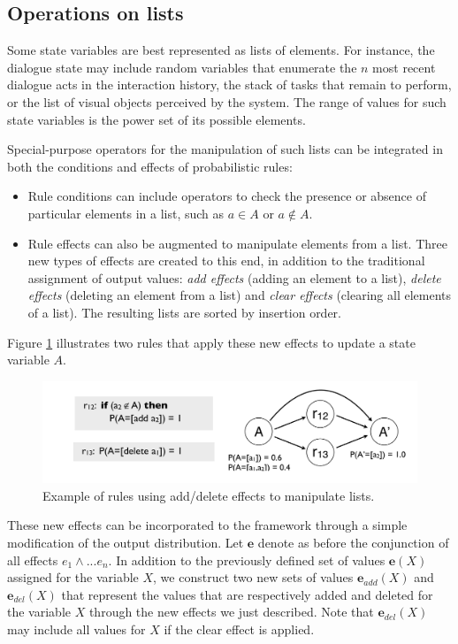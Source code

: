 \subsection{Operations on lists}

Some state variables are best represented as lists of elements. For instance, the dialogue state may include random variables that enumerate  the $n$ most recent dialogue acts in the interaction history, the stack of tasks that remain to perform, or the list of visual objects perceived by the system.  The range of values for such state variables is the power set of its possible elements. 


Special-purpose operators for the manipulation of such lists can be integrated in both the conditions and effects of probabilistic rules: 
\begin{itemize}
\item Rule conditions can include operators to check the presence or absence of particular elements in a list, such as $a \in A$ or $a \notin A$. 
\item Rule effects can also be augmented to manipulate elements from a list.  Three new types of effects are created to this end, in addition to the traditional assignment of output values: \textit{add effects} (adding an element to a list), \textit{delete effects} (deleting an element from a list) and \textit{clear effects} (clearing all elements of a list). The resulting lists are sorted by insertion order. 
\end{itemize}

Figure \ref{fig:seteffects} illustrates two rules that apply these new effects to update a state variable $A$. 
 
\begin{figure}[h]
\centering
\includegraphics[scale=0.25]{imgs/seteffects.pdf}
\caption{Example of rules using add/delete effects to manipulate lists.}
\label{fig:seteffects}
\end{figure}

These new effects can be incorporated to the framework through a simple modification of the output distribution. Let $\mathbf{e}$ denote as before the conjunction of all effects $e_1 \land ... e_n$. In addition to the previously defined set of values $\mathbf{e}(X)$ assigned for the variable $X$, we construct two new sets of values $\mathbf{e}_{add}(X)$ and $\mathbf{e}_{del}(X)$ that represent the values that are respectively added and deleted for the variable $X$ through the new effects we just described. Note that $\mathbf{e}_{del}(X)$ may include all values for $X$ if the clear effect is applied. 

